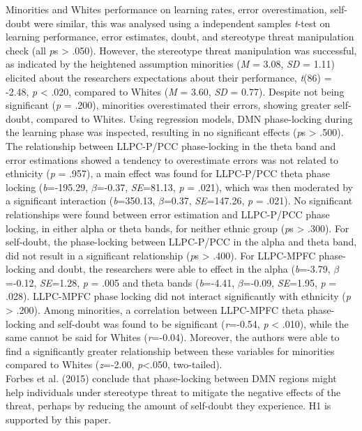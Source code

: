 \documentclass[
  stu]{apa7}
\begin{document}
Minorities and Whites performance on learning rates, error overestimation, self-doubt were similar, this was analysed using a independent samples \emph{t}-test on learning performance, error estimates, doubt, and stereotype threat manipulation check (all \emph{p}s \textgreater{} .050).
However, the stereotype threat manipulation was successful, as indicated by the heightened assumption minorities (\emph{M} = 3.08, \emph{SD} = 1.11) elicited about the researchers expectations about their performance, \emph{t}(86) = -2.48, \emph{p} \textless{} .020, compared to Whites (\emph{M} = 3.60, \emph{SD} = 0.77).
Despite not being significant (\emph{p} = .200), minorities overestimated their errors, showing greater self-doubt, compared to Whites.
Using regression models, DMN phase-locking during the learning phase was inspected, resulting in no significant effects (\emph{p}s \textgreater{} .500).
The relationship between LLPC-P/PCC phase-locking in the theta band and error estimations showed a tendency to overestimate errors was not related to ethnicity (\emph{p} = .957), a main effect was found for LLPC-P/PCC theta phase locking (\emph{b}=-195.29, \(\beta\)=-0.37, \emph{SE}=81.13, \emph{p} = .021), which was then moderated by a significant interaction (\emph{b}=350.13, \(\beta\)=0.37, \emph{SE}=147.26, \emph{p} = .021).
No significant relationships were found between error estimation and LLPC-P/PCC phase locking, in either alpha or theta bands, for neither ethnic group (\emph{p}s \textgreater{} .300).
For self-doubt, the phase-locking between LLPC-P/PCC in the alpha and theta band, did not result in a significant relationship (\emph{p}s \textgreater{} .400).
For LLPC-MPFC phase-locking and doubt, the researchers were able to effect in the alpha (\emph{b}=-3.79, \(\beta\)=-0.12, \emph{SE}=1.28, \emph{p} = .005 and theta bands (\emph{b}=-4.41, \(\beta\)=-0.09, \emph{SE}=1.95, \emph{p} = .028).
LLPC-MPFC phase locking did not interact significantly with ethnicity (\emph{p} \textgreater{} .200).
Among minorities, a correlation between LLPC-MPFC theta phase-locking and self-doubt was found to be significant (\emph{r}=-0.54, \emph{p} \textless{} .010), while the same cannot be said for Whites (\emph{r}=-0.04).
Moreover, the authors were able to find a significantly greater relationship between these variables for minorities compared to Whites (\emph{z}=-2.00, \emph{p}\textless.050, two-tailed).\\
Forbes et al. (2015) conclude that phase-locking between DMN regions might help individuals under stereotype threat to mitigate the negative effects of the threat, perhaps by reducing the amount of self-doubt they experience.
H1 is supported by this paper.
\end{document}
